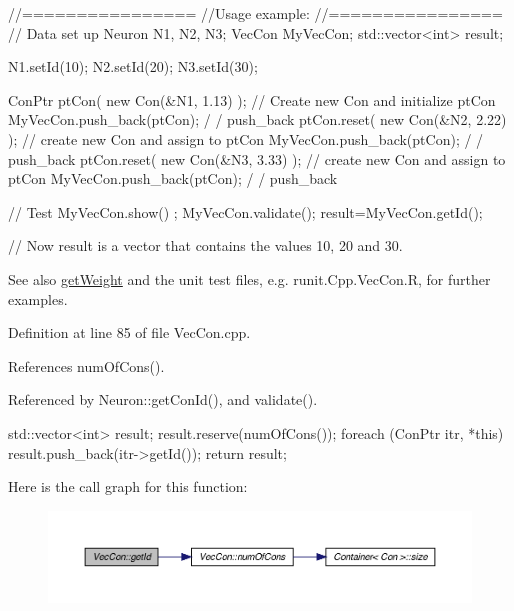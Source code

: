 \begin{DoxyCode}
  //================
  //Usage example:
  //================
        // Data set up
                        Neuron N1, N2, N3;
                        VecCon MyVecCon;
                        std::vector<int> result;

                        N1.setId(10);
                        N2.setId(20);
                        N3.setId(30);

                        ConPtr ptCon( new Con(&N1, 1.13) );     // Create new Con
       and initialize ptCon
                        MyVecCon.push_back(ptCon);                              /
      / push_back
                        ptCon.reset(  new Con(&N2, 2.22) );             // create
       new Con and assign to ptCon
                        MyVecCon.push_back(ptCon);                              /
      / push_back
                        ptCon.reset(  new Con(&N3, 3.33) );             // create
       new Con and assign to ptCon
                        MyVecCon.push_back(ptCon);                              /
      / push_back

        // Test
                        MyVecCon.show() ;
                        MyVecCon.validate();
                        result=MyVecCon.getId();

        // Now result is a vector that contains the values 10, 20 and 30.
\end{DoxyCode}


\begin{DoxySeeAlso}{See also}
\hyperlink{class_vec_con_aafa37c30d566b8784ac84d23a14b5638}{getWeight} and the unit test files, e.g. runit.Cpp.VecCon.R, for further examples. 
\end{DoxySeeAlso}


Definition at line 85 of file VecCon.cpp.



References numOfCons().



Referenced by Neuron::getConId(), and validate().


\begin{DoxyCode}
                              {
        std::vector<int> result;
        result.reserve(numOfCons());
        foreach (ConPtr itr, *this){
                result.push_back(itr->getId());
        }
        return result;
}
\end{DoxyCode}


Here is the call graph for this function:
\nopagebreak
\begin{figure}[H]
\begin{center}
\leavevmode
\includegraphics[width=400pt]{class_vec_con_a03d5dde143e166e68b01c9596573eb5f_cgraph}
\end{center}
\end{figure}





